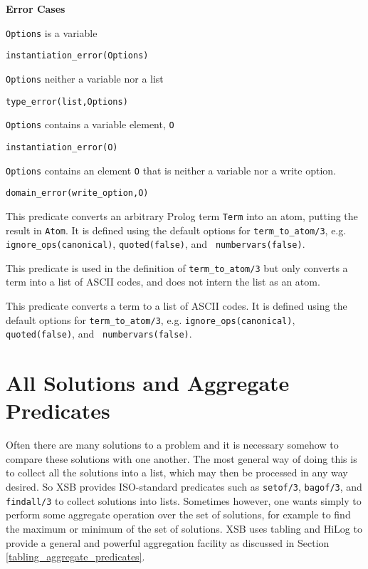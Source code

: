 \begin{description}
{\bf Error Cases} 
\bi
\item 	{\tt Options} is a variable
\bi
\item    {\tt instantiation\_error(Options)}
\ei
\item 	{\tt Options} neither a variable nor a list
\bi
\item    {\tt type\_error(list,Options)}
\ei
\item 	{\tt Options} contains a variable element, {\tt O}
\bi
\item    {\tt instantiation\_error(O)}
\ei
\item 	{\tt Options} contains an element {\tt O} that is neither a variable
nor a write option.
\bi
\item    {\tt domain\_error(write\_option,O)}
\ei
\ei

%
This predicate converts an arbitrary Prolog term {\tt Term} into an
atom, putting the result in {\tt Atom}.  It is defined using the
default options for {\tt term\_to\_atom/3}, e.g. {\tt
ignore\_ops(canonical)}, {\tt quoted(false)}, and {\tt
numbervars(false)}.

%
This predicate is used in the definition of {\tt term\_to\_atom/3} but
only converts a term into a list of ASCII codes, and does not intern
the list as an atom.

%
This predicate converts a term to a list of ASCII codes.  It is
defined using the default options for {\tt term\_to\_atom/3},
e.g. {\tt ignore\_ops(canonical)}, {\tt quoted(false)}, and {\tt
numbervars(false)}.

\end{description}


\section{All Solutions and Aggregate Predicates}
 
Often there are many solutions to a problem and it is necessary
somehow to compare these solutions with one another.  The most general
way of doing this is to collect all the solutions into a list, which
may then be processed in any way desired.  So XSB provides
ISO-standard predicates such as {\tt setof/3}, {\tt bagof/3}, and {\tt
findall/3} to collect solutions into lists.  Sometimes however, one
wants simply to perform some aggregate operation over the set of
solutions, for example to find the maximum or minimum of the set of
solutions.  XSB uses tabling and HiLog to provide a general and
powerful aggregation facility as discussed in Section
\ref{tabling_aggregate_predicates}.

